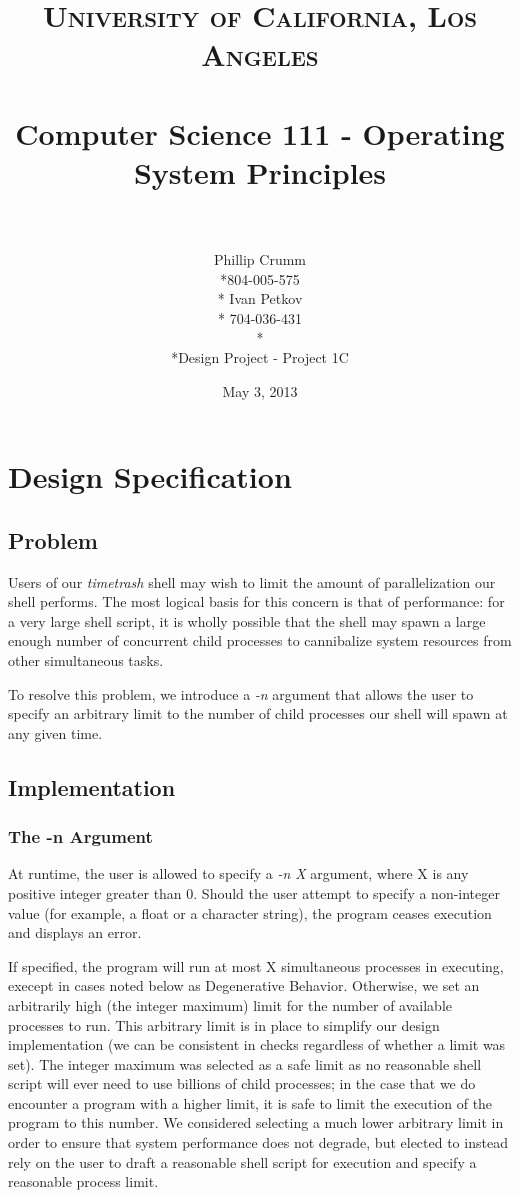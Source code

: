 \documentclass[paper=letter, fontsize=11pt]{scrartcl} %
\title{	
\normalfont \normalsize 
\textsc{University of California, Los Angeles} \\ [25pt]
\horrule{0.5pt} \\[0.4cm] %
\Large Computer Science 111 - Operating System Principles \\ %
\horrule{2pt} \\[0.5cm] %
}
\author{Phillip Crumm \\*804-005-575 \\* Ivan Petkov \\* 704-036-431 \\* \\*Design Project - Project 1C}
\date{\normalsize May 3, 2013}
\begin{document}
\clearpage\maketitle %

\thispagestyle{empty}

\pagebreak %


\section{Design Specification}
\subsection{Problem}

Users of our \emph{timetrash} shell may wish to limit the amount of parallelization our shell performs. The most logical basis for this concern is that of performance: for a very large shell script, it is wholly possible that the shell may spawn a large enough number of concurrent child processes to cannibalize system resources from other simultaneous tasks.

To resolve this problem, we introduce a \emph{-n} argument that allows the user to specify an arbitrary limit to the number of child processes our shell will spawn at any given time.

\subsection{Implementation}
\subsubsection{The -n Argument}
At runtime, the user is allowed to specify a \emph{-n X} argument, where X is any positive integer greater than 0. Should the user attempt to specify a non-integer value (for example, a float or a character string), the program ceases execution and displays an error.

If specified, the program will run at most X simultaneous processes in executing, execept in cases noted below as Degenerative Behavior. Otherwise, we set an arbitrarily high (the integer maximum) limit for the number of available processes to run. This arbitrary limit is in place to simplify our design implementation (we can be consistent in checks regardless of whether a limit was set). The integer maximum was selected as a safe limit as no reasonable shell script will ever need to use billions of child processes; in the case that we do encounter a program with a higher limit, it is safe to limit the execution of the program to this number. We considered selecting a much lower arbitrary limit in order to ensure that system performance does not degrade, but elected to instead rely on the user to draft a reasonable shell script for execution and specify a reasonable process limit.
\end{document}
